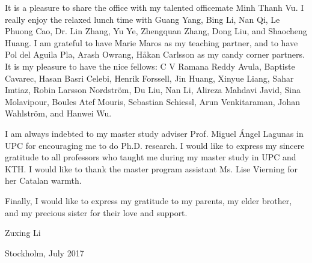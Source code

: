 It is a pleasure to share the office with my talented officemate Minh Thanh Vu. I really enjoy the relaxed lunch time with Guang Yang, Bing Li, Nan Qi, Le Phuong Cao, Dr. Lin Zhang, Yu Ye, Zhengquan Zhang, Dong Liu, and Shaocheng Huang. I am grateful to have Marie Maros as my teaching partner, and to have Pol del Aguila Pla, Arash Owrang, H\r{a}kan Carlsson as my candy corner partners. It is my pleasure to have the nice fellows: C V Ramana Reddy Avula, Baptiste Cavarec, Hasan Basri Celebi, Henrik Forssell, Jin Huang, Xinyue Liang, Sahar Imtiaz, Robin Larsson Nordstr\"{o}m, Du Liu, Nan Li, Alireza Mahdavi Javid, Sina Molavipour, Boules Atef Mouris, Sebastian Schiessl, Arun Venkitaraman, Johan Wahlstr\"{o}m, and Hanwei Wu.

I am always indebted to my master study adviser Prof. Miguel \'{A}ngel Lagunas in UPC for encouraging me to do Ph.D. research. I would like to express my sincere gratitude to all professors who taught me during my master study in UPC and KTH. I would like to thank the master program assistant Ms. Lise Vierning for her Catalan warmth.

Finally, I would like to express my gratitude to my parents, my elder brother, and my precious sister for their love and support.\newline

\hfill
Zuxing Li

\hfill
Stockholm, July 2017

